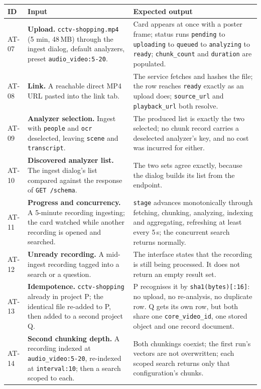 \documentclass[11pt,a4paper]{article}
\begin{document}
\begin{table}[htbp]
\centering
\scriptsize
\begin{tabularx}{\textwidth}{@{}L{0.85cm}XX@{}}
\toprule
\textbf{ID} & \textbf{Input} & \textbf{Expected output} \\
\midrule
AT-07 & \textbf{Upload.} \texttt{cctv-shopping.mp4} (5 min, 48\,MB) through the ingest dialog, default analyzers, preset \texttt{audio\_video:5-20}. & Card appears at once with a poster frame; status runs \texttt{pending} to \texttt{uploading} to \texttt{queued} to \texttt{analyzing} to \texttt{ready}; \texttt{chunk\_count} and \texttt{duration} are populated. \\
AT-08 & \textbf{Link.} A reachable direct MP4 URL pasted into the link tab. & The service fetches and hashes the file; the row reaches \texttt{ready} exactly as an upload does; \texttt{source\_url} and \texttt{playback\_url} both resolve. \\
AT-09 & \textbf{Analyzer selection.} Ingest with \texttt{people} and \texttt{ocr} deselected, leaving \texttt{scene} and \texttt{transcript}. & The produced list is exactly the two selected; no chunk record carries a deselected analyzer's key, and no cost was incurred for either. \\
AT-10 & \textbf{Discovered analyzer list.} The ingest dialog's list compared against the response of \texttt{GET /schema}. & The two sets agree exactly, because the dialog builds its list from the endpoint. \\
AT-11 & \textbf{Progress and concurrency.} A 5-minute recording ingesting; the card watched while another recording is opened and searched. & \texttt{stage} advances monotonically through fetching, chunking, analyzing, indexing and aggregating, refreshing at least every 5\,s; the concurrent search returns normally. \\
AT-12 & \textbf{Unready recording.} A mid-ingest recording tagged into a search or a question. & The interface states that the recording is still being processed. It does not return an empty result set. \\
AT-13 & \textbf{Idempotence.} \texttt{cctv-shopping} already in project P; the identical file re-added to P, then added to a second project Q. & P recognises it by \texttt{sha1(bytes)[:16]}: no upload, no re-analysis, no duplicate row. Q gets its own row, but both share one \texttt{core\_video\_id}, one stored object and one record document. \\
AT-14 & \textbf{Second chunking depth.} A recording indexed at \texttt{audio\_video:5-20}, re-indexed at \texttt{interval:10}; then a search scoped to each. & Both chunkings coexist; the first run's vectors are not overwritten; each scoped search returns only that configuration's chunks. \\

\end{tabularx}
\end{table}
\end{document}
